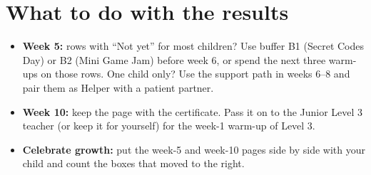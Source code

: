 \section{What to do with the results}
\begin{itemize}[itemsep=2pt]
  \item \textbf{Week 5:} rows with \enquote{Not yet} for most children? Use buffer B1 (Secret Codes
        Day) or B2 (Mini Game Jam) before week 6, or spend the next three warm-ups on those rows. One
        child only? Use the support path in weeks 6--8 and pair them as Helper with a patient partner.
  \item \textbf{Week 10:} keep the page with the certificate. Pass it on to the Junior Level 3 teacher
        (or keep it for yourself) for the week-1 warm-up of Level 3.
  \item \textbf{Celebrate growth:} put the week-5 and week-10 pages side by side with your child and
        count the boxes that moved to the right.
\end{itemize}
